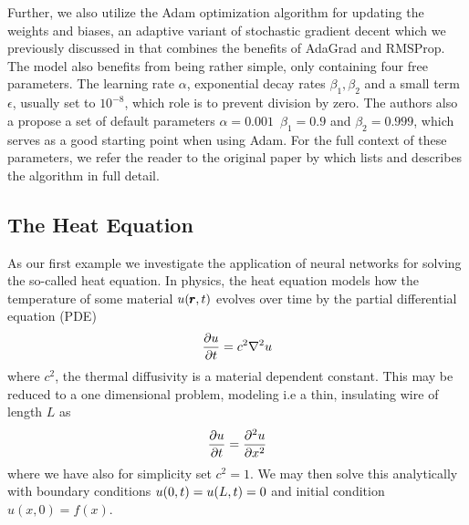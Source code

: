 \documentclass[reprint, english, nofootinbib]{revtex4-2}
\begin{document}
Further, we also utilize the Adam optimization algorithm \cite{kingma2017adam} for updating the weights and biases, an adaptive variant of stochastic gradient decent which we previously discussed in \cite{4155_project_2} that combines the benefits of AdaGrad and RMSProp. The model also benefits from being rather simple, only containing four free parameters. The learning rate $\alpha$, exponential decay rates $\beta_1, \beta_2$ and a small term $\epsilon$, usually set to $10^{-8}$, which role is to prevent division by zero. The authors also a propose a set of default parameters $\alpha=0.001\enspace \beta_1=0.9$ and $\beta_2 = 0.999$, which serves as a good starting point when using Adam. For the full context of these parameters, we refer the reader to the original paper by \textcite{kingma2017adam} which lists and describes the algorithm in full detail.

\subsection{The Heat Equation\label{sec:Heat equation analytical}}
\noindent
As our first example we investigate the application of neural networks for solving the so-called heat equation. In physics, the heat equation models how the temperature of some material $u\qty(\pmb r, t)$ evolves over time by the partial differential equation (PDE)
\begin{equation}
    \pdv{u}{t} = c^2\nabla^2 u 
\end{equation}
where $c^2$, the thermal diffusivity is a material dependent constant. 
This may be reduced to a one dimensional problem, modeling i.e a thin, insulating wire of length $L$ as
\begin{equation}\label{eqn: 1D heat eqn}
    \pdv{u}{t} = \pdv[2]{u}{x}
\end{equation}
where we have also for simplicity set $c^2 = 1$. We may then solve this analytically with boundary conditions $u\qty(0, t) = u\qty(L,t) = 0$ and initial condition $u(x, 0) = f(x)$.
\end{document}
